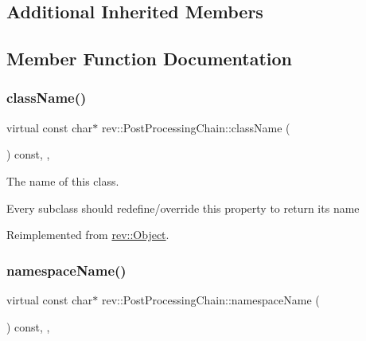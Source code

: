 \subsection*{Additional Inherited Members}


\subsection{Member Function Documentation}
\mbox{\label{classrev_1_1_post_processing_chain_a500b7e99127d6a31215edf1b14fdd7ee}} 
\subsubsection{\texorpdfstring{className()}{className()}}
{\footnotesize\ttfamily virtual const char$\ast$ rev\+::\+Post\+Processing\+Chain\+::class\+Name (\begin{DoxyParamCaption}{ }\end{DoxyParamCaption}) const\hspace{0.3cm}{\ttfamily [inline]}, {\ttfamily [override]}, {\ttfamily [virtual]}}



The name of this class. 

Every subclass should redefine/override this property to return its name 

Reimplemented from \mbox{\hyperlink{classrev_1_1_object_a7a2013f91169479b65cf93afdc5d9a68}{rev\+::\+Object}}.

\mbox{\label{classrev_1_1_post_processing_chain_a8fc3834c337ee526386f622ef314cae6}} 
\subsubsection{\texorpdfstring{namespaceName()}{namespaceName()}}
{\footnotesize\ttfamily virtual const char$\ast$ rev\+::\+Post\+Processing\+Chain\+::namespace\+Name (\begin{DoxyParamCaption}{ }\end{DoxyParamCaption}) const\hspace{0.3cm}{\ttfamily [inline]}, {\ttfamily [override]}, {\ttfamily [virtual]}}



